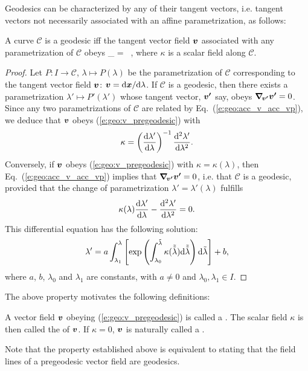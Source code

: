 Geodesics can be characterized by any of their tangent vectors, i.e.
tangent vectors not necessarily associated with an affine parametrization, as follows:
\begin{greybox}
A curve $\mathcal{C}$ is a geodesic
iff the tangent vector field $\bm{v}$ associated with any parametrization
of $\mathcal{C}$ obeys
\be \label{e:geo:v_pregeodesic}
    \wnab_{\!} = \kappa\,  ,
\ee
where $\kappa$ is a scalar field along $\mathcal{C}$.
\end{greybox}
\begin{proof}
Let $P: I\to \mathcal{C}$, $\lambda\mapsto P(\lambda)$ be the parametrization of $\mathcal{C}$
corresponding to the tangent vector field $\bm{v}$: $\bm{v} = \mathrm{d}\bm{x}/\mathrm{d}\lambda$.
If $\mathcal{C}$ is a geodesic, then there exists a parametrization
$\lambda'\mapsto P'(\lambda')$ whose tangent vector, $\bm{v'}$ say, obeys
$\bm{\nabla}_{\!\bm{v'}}\bm{v'} = 0$. Since any two parametrizations of $\mathcal{C}$
are related by Eq.~(\ref{e:geo:acc_v_acc_vp}), we deduce that $\bm{v}$ obeys
(\ref{e:geo:v_pregeodesic}) with
\[
    \kappa = \left( \frac{\mathrm{d}\lambda'}{\mathrm{d}\lambda} \right)^{-1}
        \frac{\mathrm{d}^2\lambda'}{\mathrm{d}\lambda^2} .
\]
Conversely, if $\bm{v}$ obeys (\ref{e:geo:v_pregeodesic}) with $\kappa=\kappa(\lambda)$,
then Eq.~(\ref{e:geo:acc_v_acc_vp}) implies that $\bm{\nabla}_{\!\bm{v'}}\bm{v'} = 0$,
i.e. that $\mathcal{C}$ is a geodesic, provided that the change of
parametrization $\lambda' = \lambda'(\lambda)$ fulfills
\[
    \kappa(\lambda) \frac{\mathrm{d}\lambda'}{\mathrm{d}\lambda} -  \frac{\mathrm{d}^2\lambda'}{\mathrm{d}\lambda^2} = 0 .
\]
This differential equation has the following solution:
\[
    \lambda' = a \int_{\lambda_1}^\lambda \left[ \exp \left(
    \int_{\lambda_0}^{\tilde{\lambda}} \kappa(\tilde{\tilde{\lambda}})
    \mathrm{d}\tilde{\tilde{\lambda}}\right) \mathrm{d}\tilde\lambda
    \right] + b,
\]
where $a$, $b$, $\lambda_0$ and $\lambda_1$ are constants, with $a\not = 0$ and $\lambda_0,\lambda_1\in I$.
\end{proof}
The above property motivates the following definitions:
\begin{greybox}
A vector field $\bm{v}$ obeying (\ref{e:geo:v_pregeodesic}) is called
a .
The scalar field $\kappa$ is then called the  of $\bm{v}$.
If $\kappa=0$, $\bm{v}$ is naturally called a .
\end{greybox}
Note that the property established above is equivalent to stating that the
field lines of a pregeodesic vector field are geodesics.

